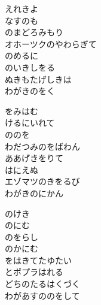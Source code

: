 \documentclass[10pt,b5j]{tarticle} %
\begin{document}
\vspace{1.5em} %
\newcommand{\linespace}{0.5em} %
\newcommand{\blocksize}{0.5\hsize} %
\begin{enumerate} %
    \begin{minipage}[c]{\blocksize}
    
        \vspace{\linespace}
        \item
        えれきよ\\
        なすのも\\
        のまどろみもり\\
        オホーツクのやわらぎて\\
        のめるに\\
        のいきしをる\\
        ぬきもたげしきは\\
        わがきのをく
        
        \vspace{\linespace}
        \item
        をみはむ\\
        けるにいれて\\
        ののを\\
        わだつみのをばわん\\
        ああげきをりて\\
        はにえぬ\\
        エゾマツのきをるび\\
        わがきのにかん
        
        \vspace{\linespace}
        \item
        のけき\\
        のにむ\\
        のをらし\\
        のかにむ\\
        をはきてたゆたい\\
        とポプラはれる\\
        どちのたるはくづく\\
        わがあすののをして
        

\end{minipage}
\end{enumerate}
\end{document}
